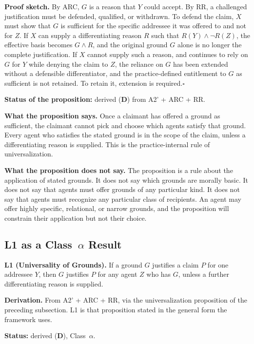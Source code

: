 \documentclass[11pt]{article}
\def\ensuremath#1{#1}%
\def\mathrm#1{#1}%
\newcommand{\statusD}{\textcolor{stD}{\textbf{D}}}
\newcommand{\Atwo}{\texorpdfstring{\ensuremath{\mathrm{A2}'}}{A2'}}
\newcommand{\ca}{\texorpdfstring{Class~$\alpha$}{Class alpha}}
\begin{document}
\textbf{Proof sketch.} By ARC, $G$ is a reason that $Y$ could accept. By RR, a challenged justification must be defended, qualified, or withdrawn. To defend the claim, $X$ must show that $G$ is sufficient for the specific addressee it was offered to and not for $Z$. If $X$ can supply a differentiating reason $R$ such that $R(Y) \land \neg R(Z)$, the effective basis becomes $G \land R$, and the original ground $G$ alone is no longer the complete justification. If $X$ cannot supply such a reason, and continues to rely on $G$ for $Y$ while denying the claim to $Z$, the reliance on $G$ has been extended without a defensible differentiator, and the practice-defined entitlement to $G$ as sufficient is not retained. To retain it, extension is required.\hfill$\square$

\textbf{Status of the proposition:} derived (\statusD{}) from \Atwo{} + ARC + RR.

\textbf{What the proposition says.} Once a claimant has offered a ground as sufficient, the claimant cannot pick and choose which agents satisfy that ground. Every agent who satisfies the stated ground is in the scope of the claim, unless a differentiating reason is supplied. This is the practice-internal rule of universalization.

\textbf{What the proposition does not say.} The proposition is a rule about the application of stated grounds. It does not say which grounds are morally basic. It does not say that agents must offer grounds of any particular kind. It does not say that agents must recognize any particular class of recipients. An agent may offer highly specific, relational, or narrow grounds, and the proposition will constrain their application but not their choice.

\subsection{L1 as a \ca{} Result}
\begin{paperbox}
\textbf{L1 (Universality of Grounds).} If a ground $G$ justifies a claim $P$ for one addressee $Y$, then $G$ justifies $P$ for any agent $Z$ who has $G$, unless a further differentiating reason is supplied.
\end{paperbox}

\textbf{Derivation.} From \Atwo{} + ARC + RR, via the universalization proposition of the preceding subsection. L1 is that proposition stated in the general form the framework uses.

\textbf{Status:} derived (\statusD{}), \ca{}.
\end{document}
